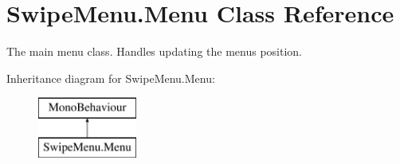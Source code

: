 \hypertarget{class_swipe_menu_1_1_menu}{}\section{Swipe\+Menu.\+Menu Class Reference}
\label{class_swipe_menu_1_1_menu}


The main menu class. Handles updating the menus position.  


Inheritance diagram for Swipe\+Menu.\+Menu\+:\begin{figure}[H]
\begin{center}
\leavevmode
\includegraphics[height=2.000000cm]{class_swipe_menu_1_1_menu}
\end{center}
\end{figure}
